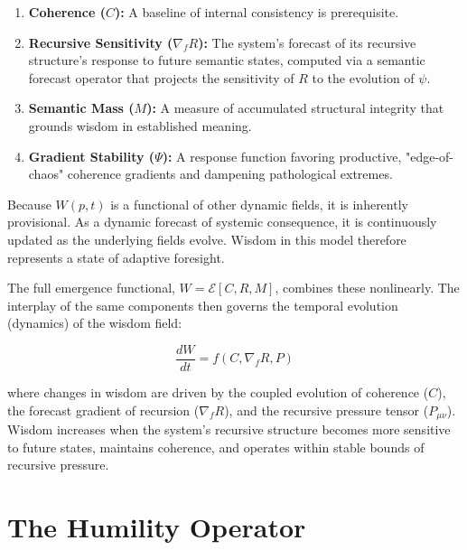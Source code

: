 \begin{enumerate}

    \item \textbf{Coherence (\(C\)):} A baseline of internal consistency is prerequisite.
    
    \item \textbf{Recursive Sensitivity (\(\nabla_f R\)):} The system's forecast of its recursive structure's response to future semantic states, computed via a semantic forecast operator that projects the sensitivity of \(R\) to the evolution of \(\psi\).
    
    \item \textbf{Semantic Mass (\(M\)):} A measure of accumulated structural integrity that grounds wisdom in established meaning.
    
    \item \textbf{Gradient Stability (\(\Psi\)):} A response function favoring productive, "edge-of-chaos" coherence gradients and dampening pathological extremes.

\end{enumerate}

Because \(W(p,t)\) is a functional of other dynamic fields, it is inherently provisional. As a dynamic forecast of systemic consequence, it is continuously updated as the underlying fields evolve. Wisdom in this model therefore represents a state of adaptive foresight.

The full emergence functional, \(W = \mathcal{E}[C, R, M]\), combines these nonlinearly. The interplay of the same components then governs the temporal evolution (dynamics) of the wisdom field:

\begin{equation}
\frac{dW}{dt} = f(C, \nabla_f R, P)
\end{equation}

where changes in wisdom are driven by the coupled evolution of coherence (\(C\)), the forecast gradient of recursion (\(\nabla_f R\)), and the recursive pressure tensor (\(P_{\mu\nu}\)). Wisdom increases when the system's recursive structure becomes more sensitive to future states, maintains coherence, and operates within stable bounds of recursive pressure.


\section{The Humility Operator}
\label{8.3:the_humility_operator}

